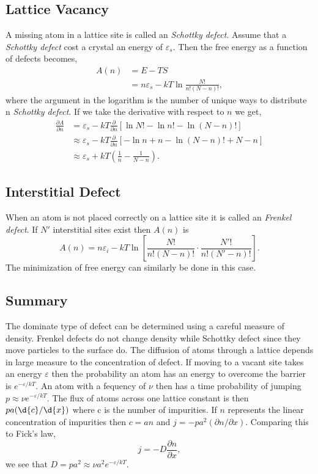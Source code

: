\subsection{Lattice Vacancy}
A missing atom in a lattice site is called an \textit{Schottky defect}. Assume
that a \textit{Schottky defect} cost a crystal an energy of $\varepsilon_s$.
Then the free energy as a function of defects becomes,
\begin{align*}
	A(n) &= E - TS\\
		 &= n \varepsilon_s - kT \ln{\frac{N!}{n!(N-n)!}},
\end{align*}
where the argument in the logarithm is the number of unique ways to distribute n
\textit{Schottky defect}. If we take the derivative with respect to $n$ we get,
\begin{align*}
	\frac{\partial A}{\partial n} &= \varepsilon_s - kT\frac{\partial}{\partial
	n}{\left[ \ln{N!} - \ln{n!} - \ln{(N - n)!}\right]}\\
	&\approx \varepsilon_s - kT\frac{\partial}{\partial n}{\left[ -\ln{n} + n
	-\ln{(N-n)!} + N - n \right]}\\
	&\approx \varepsilon_s + kT{\left(\frac{1}{n} - \frac{1}{N-n}\right)}.
\end{align*}

\subsection{Interstitial Defect}
When an atom is not placed correctly on a lattice site it is called an
\textit{Frenkel defect}. If $N'$ interstitial sites exist then $A(n)$ is
\begin{equation*}
	A(n) = n\varepsilon_i - kT \ln{\left[\frac{N!}{n!(N-n)!} \cdot
	\frac{N'!}{n!(N' - n)!}\right]}.
\end{equation*}
The minimization of free energy can similarly be done in this case.

\subsection{Summary}
The dominate type of defect can be determined using a careful measure of
density. Frenkel defects do not change density while Schottky defect since they
move particles to the surface do. The diffusion of atoms through a lattice
depends in large measure to the concentration of defect. If moving to a vacant
site takes an energy $\varepsilon$ then the probability an atom has an energy to
overcome the barrier is $e^{-\varepsilon /kT}$. An atom with a fequency of $\nu$
then has a time probability of jumping $p \approx \nu e^{-\varepsilon /kT}$. The
flux of atoms across one lattice constant is then $pa (\d{c}/\d{x})$ where c is
the number of impurities. If  $n$ represents the linear concentration of
impurities then $c = an$ and $j = -pa^2 (\partial n / \partial x)$. Comparing
this to Fick's law,
\begin{equation*}
	j = -D \frac{\partial n}{\partial x},
\end{equation*}
we see that $D = pa^2 \approx \nu a^2 e^{-\varepsilon /kT}$.

